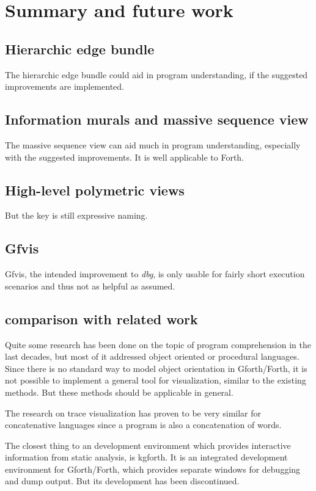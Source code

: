 \chapter{Summary and future work}
\label{chap:Summary}

\section*{Hierarchic edge bundle}
The hierarchic edge bundle could aid in program understanding, if the suggested improvements are implemented.

\section*{Information murals and massive sequence view}
The massive sequence view can aid much in program understanding, especially with the suggested improvements. It is well applicable to Forth.

\section*{High-level polymetric views}

But the key is still expressive naming.

\section*{Gfvis}

Gfvis, the intended improvement to \emph{dbg}, is only usable for fairly short execution scenarios and thus not as helpful as assumed.

\section{comparison with related work}

Quite some research has been done on the topic of program comprehension in the last decades, but most of it addressed object oriented or procedural languages. Since there is no standard way to model object orientation in Gforth/Forth, it is not possible to implement a general tool for visualization, similar to the existing methods. But these methods should be applicable in general.

The research on trace visualization has proven to be very similar for concatenative languages since a program is also a concatenation of words.

The closest thing to an development environment which provides interactive information from static analysis, is kgforth. It is an integrated development environment for Gforth/Forth, which provides separate windows for debugging and dump output. But its development has been discontinued.

